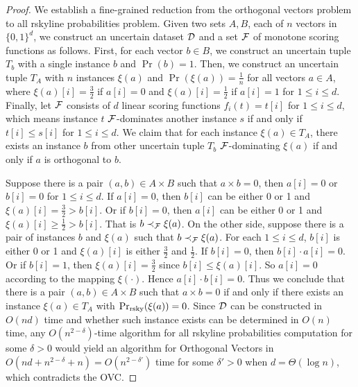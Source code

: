 \begin{proof}
	We establish a fine-grained reduction from the orthogonal vectors problem to all rskyline probabilities problem.
	Given two sets $A, B$, each of $n$ vectors in $\{0, 1\}^d$, we construct an uncertain dataset $\mathcal{D}$ and a set $\mathcal{F}$ of monotone scoring functions as follows.
	First, for each vector $b \in B$, we construct an uncertain tuple $T_b$ with a single instance $b$ and $\Pr(b) = 1$.
	Then, we construct an uncertain tuple $T_A$ with $n$ instances $\xi(a)$ and $\Pr(\xi(a)) = \frac{1}{n}$ for all vectors $a \in A$, where $\xi(a)[i] = \frac{3}{2}$ if $a[i] = 0$ and $\xi(a)[i] = \frac{1}{2}$ if $a[i] = 1$ for $1 \le i \le d$.
	Finally, let $\mathcal{F}$ consists of $d$ linear scoring functions $f_i(t) = t[i]$ for $1 \le i \le d$, which means instance $t$ $\mathcal{F}$-dominates another instance $s$ if and only if $t[i] \le s[i]$ for $1 \le i \le d$.
	We claim that for each instance $\xi(a) \in T_A$, there exists an instance $b$ from other uncertain tuple $T_b$ $\mathcal{F}$-dominating $\xi(a)$ if and only if $a$ is orthogonal to $b$.
 
	Suppose there is a pair $(a, b) \in A \times B$ such that $a \times b = 0$, then $a[i] = 0$ or $b[i] = 0$ for $1 \le i \le d$.
	If $a[i] = 0$, then $b[i]$ can be either 0 or 1 and $\xi(a)[i] = \frac{3}{2} > b[i]$.
	Or if $b[i] = 0$, then $a[i]$ can be either 0 or 1 and $\xi(a)[i] \ge \frac{1}{2} > b[i]$.
	That is $b \prec_{\mathcal{F}} \xi(a)$.
	On the other side, suppose there is a pair of instances $b$ and $\xi(a)$ such that $b \prec_{\mathcal{F}} \xi(a)$.
	For each $1 \le i \le d$, $b[i]$ is either 0 or 1 and $\xi(a)[i]$ is either $\frac{3}{2}$ and $\frac{1}{2}$.
	If $b[i] = 0$, then $b[i]\cdot a[i] = 0$.
	Or if $b[i] = 1$, then $\xi(a)[i] = \frac{3}{2}$ since $b[i] \le \xi(a)[i]$.
	So $a[i] = 0$  according to the mapping $\xi(\cdot)$.
	Hence $a[i] \cdot b[i] = 0$.
	Thus we conclude that there is a pair $(a, b) \in A \times B$ such that $a \times b = 0$ if and only if there exists an instance $\xi(a) \in T_A$ with $\Pr_{\rm rsky}(\xi(a)) = 0$.
	Since $\mathcal{D}$ can be constructed in $O(nd)$ time and whether such instance exists can be determined in $O(n)$ time, any $O(n^{2-\delta})$-time algorithm for all rskyline probabilities computation for some $\delta > 0$ would yield an algorithm for Orthogonal Vectors in $O(nd + n^{2 - \delta} + n) = O(n^{2 - \delta'})$ time for some $\delta' > 0$ when $d = \Theta(\log{n})$, which contradicts the OVC.
\end{proof}

